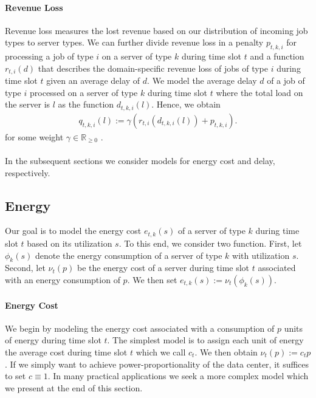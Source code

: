 \paragraph{Revenue Loss} Revenue loss measures the lost revenue based on our distribution of incoming job types to server types. We can further divide revenue loss in a penalty $p_{t,k,i}$ for processing a job of type $i$ on a server of type $k$ during time slot $t$ and a function $r_{t,i}(d)$ that describes the domain-specific revenue loss of jobs of type $i$ during time slot $t$ given an average delay of $d$. We model the average delay $d$ of a job of type $i$ processed on a server of type $k$ during time slot $t$ where the total load on the server is $l$ as the function $d_{t,k,i}(l)$. Hence, we obtain \begin{align*}
    q_{t,k,i}(l) := \gamma(r_{t,i}(d_{t,k,i}(l)) + p_{t,k,i}).
\end{align*} for some weight $\gamma \in \mathbb{R}_{\geq 0}$ \cite{Lin2011}.

\paragraph{}{In the subsequent sections we consider models for energy cost and delay, respectively.}

\subsection{Energy}\label{section:application:operating_cost:energy}

Our goal is to model the energy cost $e_{t,k}(s)$ of a server of type $k$ during time slot $t$ based on its utilization $s$. To this end, we consider two function. First, let $\phi_k(s)$ denote the energy consumption of a server of type $k$ with utilization $s$. Second, let $\nu_t(p)$ be the energy cost of a server during time slot $t$ associated with an energy consumption of $p$. We then set $e_{t,k}(s) := \nu_t(\phi_k(s))$.

\paragraph{Energy Cost} We begin by modeling the energy cost associated with a consumption of $p$ units of energy during time slot $t$. The simplest model is to assign each unit of energy the average cost during time slot $t$ which we call $c_t$. We then obtain $\nu_t(p) := c_t p$. If we simply want to achieve power-proportionality of the data center, it suffices to set $c \equiv 1$. In many practical applications we seek a more complex model which we present at the end of this section.

